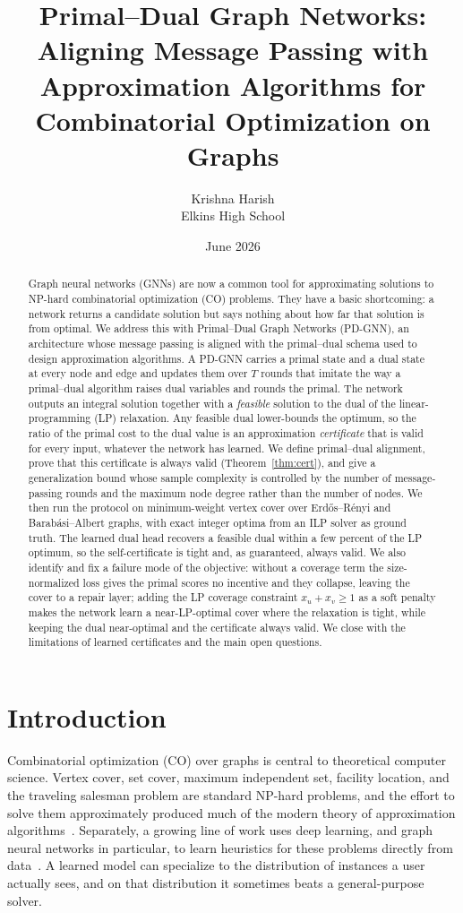 \documentclass[11pt]{article}
\title{\bfseries Primal--Dual Graph Networks: Aligning Message Passing with
Approximation Algorithms for Combinatorial Optimization on Graphs}
\author{Krishna Harish \\ Elkins High School}
\date{June 2026}
\theoremstyle{plain}
\theoremstyle{definition}
\theoremstyle{remark}
\newcommand{\PDGNN}{\textsc{PD-GNN}}
\begin{document}
\maketitle

\begin{abstract}
Graph neural networks (GNNs) are now a common tool for approximating solutions
to NP-hard combinatorial optimization (CO) problems. They have a basic
shortcoming: a network returns a candidate solution but says nothing about how
far that solution is from optimal. We address this with Primal--Dual Graph
Networks (\PDGNN), an architecture whose message passing is aligned with the
primal--dual schema used to design approximation algorithms. A \PDGNN{} carries
a primal state and a dual state at every node and edge and updates them over $T$
rounds that imitate the way a primal--dual algorithm raises dual variables and
rounds the primal. The network outputs an integral solution together with a
\emph{feasible} solution to the dual of the linear-programming (LP) relaxation.
Any feasible dual lower-bounds the optimum, so the ratio of the primal cost to
the dual value is an approximation \emph{certificate} that is valid for every
input, whatever the network has learned. We define primal--dual alignment,
prove that this certificate is always valid (Theorem~\ref{thm:cert}), and give a
generalization bound whose sample complexity is controlled by the number of
message-passing rounds and the maximum node degree rather than the number of
nodes. We then run the protocol on minimum-weight vertex cover over
Erd\H{o}s--R\'enyi and Barab\'asi--Albert graphs, with exact integer optima from
an ILP solver as ground truth. The learned dual head recovers a feasible dual
within a few percent of the LP optimum, so the self-certificate is tight and, as
guaranteed, always valid. We also identify and fix a failure mode of the
objective: without a coverage term the size-normalized loss gives the primal
scores no incentive and they collapse, leaving the cover to a repair layer;
adding the LP coverage constraint $x_u+x_v\ge1$ as a soft penalty makes the
network learn a near-LP-optimal cover where the relaxation is tight, while
keeping the dual near-optimal and the certificate always valid. We close with the
limitations of learned certificates and the main open questions.
\end{abstract}

\section{Introduction}
Combinatorial optimization (CO) over graphs is central to theoretical computer
science. Vertex cover, set cover, maximum independent set, facility location,
and the traveling salesman problem are standard NP-hard problems, and the effort
to solve them approximately produced much of the modern theory of approximation
algorithms~\citep{williamson2011design}. Separately, a growing line of work uses
deep learning, and graph neural networks in particular, to learn heuristics for
these problems directly from data~\citep{khalil2017learning, bello2016neural,
gasse2019exact}. A learned model can specialize to the distribution of instances
a user actually sees, and on that distribution it sometimes beats a
general-purpose solver.
\end{document}
